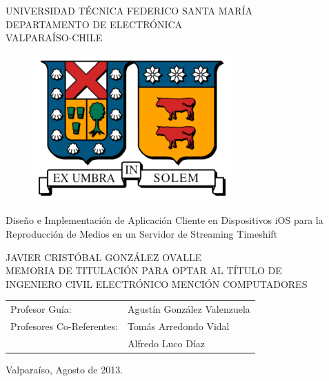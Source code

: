 \begin{titlepage}

\begin{center}

	\large  UNIVERSIDAD TÉCNICA FEDERICO SANTA MARÍA 	\\
 	\large \sc DEPARTAMENTO DE ELECTRÓNICA						\\
 	\large \sc VALPARAÍSO-CHILE												\\
\vspace*{0.5cm}
\begin{figure}[h!]
	\centering
 	\includegraphics[scale=1]{imgs/logo_utfsm.eps} 
\end{figure}
\end{center}

\begin{center}
 \LARGE{Diseño e Implementación de Aplicación Cliente en Dispositivos iOS para la Reproducción de Medios en un Servidor de Streaming Timeshift}
\end{center}

\vspace*{1.0cm}
\begin{center}
 \normalsize JAVIER CRISTÓBAL GONZÁLEZ OVALLE\\
 \normalsize MEMORIA DE TITULACIÓN PARA OPTAR AL TÍTULO DE \\
 \normalsize INGENIERO CIVIL ELECTRÓNICO MENCIÓN COMPUTADORES
\end{center}
\vspace*{1.5cm}

\begin{center}
\begin{tabular}{ll}
 \normalsize Profesor Guía: & Agustín González Valenzuela\\
 \normalsize Profesores Co-Referentes: &Tomás Arredondo Vidal\\
 															&Alfredo Luco Díaz
\end{tabular}
\end{center}
 
\vspace*{2cm}
\begin{center}
 \normalsize Valparaíso, Agosto de 2013. \\
\end{center}
\end{titlepage}